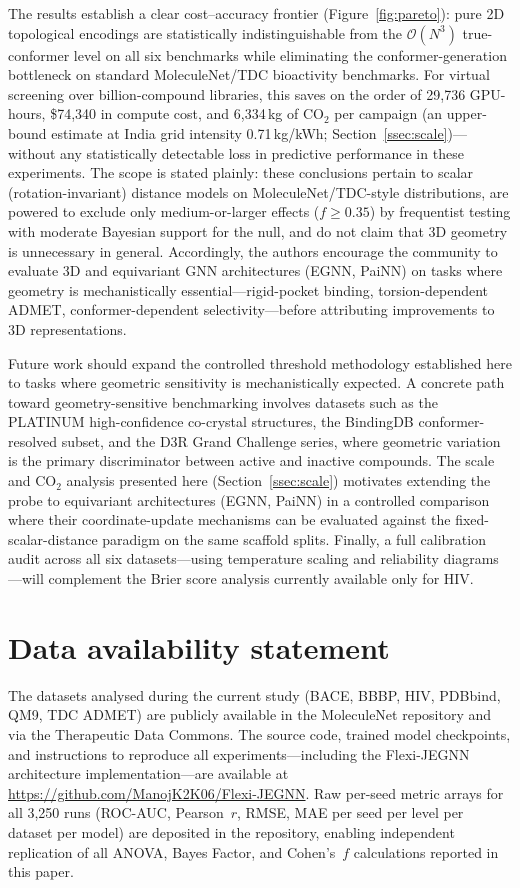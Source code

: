\documentclass[pdflatex,sn-vancouver-num]{sn-jnl}%
\theoremstyle{thmstyleone}%
\theoremstyle{thmstyletwo}%
\theoremstyle{thmstylethree}%
\begin{document}
The results establish a clear cost--accuracy frontier (Figure~\ref{fig:pareto}): pure 2D topological
encodings are statistically indistinguishable from the $\mathcal{O}(N^3)$ true-conformer level
on all six benchmarks while eliminating the conformer-generation
bottleneck on standard MoleculeNet/TDC bioactivity benchmarks. For virtual screening over billion-compound
libraries, this saves on the order of 29,736 GPU-hours, \$74,340 in compute
cost, and 6,334\,kg of CO$_2$ per campaign (an upper-bound estimate at India grid intensity
0.71\,kg/kWh; Section~\ref{ssec:scale})---without any statistically
detectable loss in predictive performance in these experiments.  The scope is stated plainly: these conclusions pertain to scalar (rotation-invariant) distance models on MoleculeNet/TDC-style distributions, are powered to exclude only medium-or-larger effects ($f \geq 0.35$) by frequentist testing with moderate Bayesian support for the null, and do not claim that 3D geometry is unnecessary in general.  Accordingly, the authors encourage the
community to evaluate 3D and equivariant GNN architectures (EGNN, PaiNN) on tasks where geometry is
mechanistically essential---rigid-pocket binding, torsion-dependent
ADMET, conformer-dependent selectivity---before attributing improvements
to 3D representations.

Future work should expand the controlled threshold methodology established here to tasks where geometric sensitivity is mechanistically expected. A concrete path toward geometry-sensitive benchmarking involves datasets such as the PLATINUM high-confidence co-crystal structures, the BindingDB conformer-resolved subset, and the D3R Grand Challenge series, where geometric variation is the primary discriminator between active and inactive compounds. The scale and CO$_2$ analysis presented here (Section~\ref{ssec:scale}) motivates extending the probe to equivariant architectures (EGNN, PaiNN) in a controlled comparison where their coordinate-update mechanisms can be evaluated against the fixed-scalar-distance paradigm on the same scaffold splits. Finally, a full calibration audit across all six datasets---using temperature scaling and reliability diagrams---will complement the Brier score analysis currently available only for HIV.




\section*{Data availability statement}
The datasets analysed during the current study (BACE, BBBP, HIV, PDBbind, QM9, TDC ADMET) are publicly available in the MoleculeNet repository and via the Therapeutic Data Commons. The source code, trained model checkpoints, and instructions to reproduce all experiments---including the Flexi-JEGNN architecture implementation---are available at \url{https://github.com/ManojK2K06/Flexi-JEGNN}. Raw per-seed metric arrays for all 3,250 runs (ROC-AUC, Pearson~$r$, RMSE, MAE per seed per level per dataset per model) are deposited in the repository, enabling independent replication of all ANOVA, Bayes Factor, and Cohen's~$f$ calculations reported in this paper.
\end{document}
